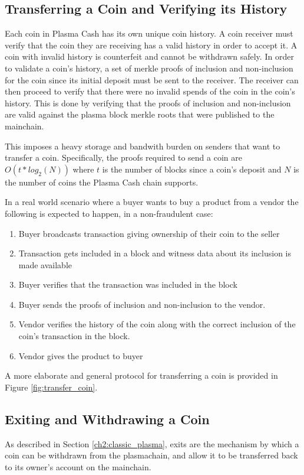\subsection{Transferring a Coin and Verifying its History}
\label{verify_coin_history}
Each coin in Plasma Cash has its own unique coin history. A coin receiver  must
verify that the coin they are receiving has a valid history in order to accept 
it. A coin with invalid history is counterfeit
and cannot be withdrawn safely. In order to validate a coin's
history, a set of merkle proofs of inclusion
and non-inclusion for the coin since its initial deposit must be sent to the receiver. The receiver can then
proceed to verify that there were no invalid spends of the coin in the coin's
history. This is done by verifying that the proofs of inclusion and non-inclusion are valid
against the plasma block merkle roots that were published to the mainchain.

This imposes a heavy storage and bandwith burden on senders that 
want to transfer a coin. Specifically, the proofs required to send a coin are 
$O(t * log_{2}(N))$ where $t$ is the number of blocks since a coin's deposit and $N$ is the number
of coins the Plasma Cash chain supports.

In a real world scenario where a buyer wants to buy a product from a vendor the
following is expected to happen, in a non-fraudulent case:
\begin{enumerate}
    \item Buyer broadcasts transaction giving ownership of their coin to the
        seller
    \item Transaction gets included in a block and witness data about its inclusion is made available
    \item Buyer verifies that the transaction was included in the block
    \item Buyer sends the proofs of inclusion and non-inclusion to the vendor.
    \item Vendor verifies the history of the coin along with the correct inclusion of the coin's transaction in the block.
    \item Vendor gives the product to buyer
\end{enumerate}

A more elaborate and general protocol for transferring a coin is provided in
Figure \ref{fig:transfer_coin}.



\subsection{Exiting and Withdrawing a Coin} \label{exiting_withdrawing}
As described in Section \ref{ch2:classic_plasma}, exits are the mechanism by
which a coin can be withdrawn from the plasmachain, and allow it to be
transferred back to its owner's account on the mainchain. 

